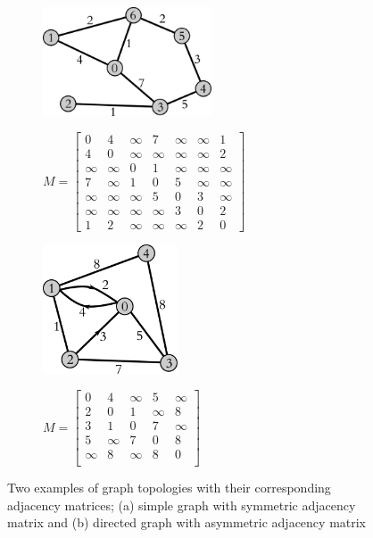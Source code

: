 \documentclass[10pt,letterpaper]{article}
\begin{document}
\begin{figure}[htbp]
\centering
\begin{subfigure}{0.49\textwidth}
\centering
\includegraphics[width=50mm]{dij1.eps}
\end{subfigure}
\begin{subfigure}{0.49\textwidth}
{
\Large
$
M=\begin{bmatrix}
0&4&\infty&7&\infty&\infty&1\\
4&0&\infty&\infty&\infty&\infty&2\\
\infty&\infty&0&1&\infty&\infty&\infty\\
7&\infty&1&0&5&\infty&\infty\\
\infty&\infty&\infty&5&0&3&\infty\\
\infty&\infty&\infty&\infty&3&0&2\\
1&2&\infty&\infty&\infty&2&0
\end{bmatrix}
$
}
\end{subfigure}
\vspace{10mm}
\begin{subfigure}{0.49\textwidth}
\centering
\includegraphics[width=40mm]{dij2.eps}
\end{subfigure}
\begin{subfigure}{0.49\textwidth}
{
\Large
$
M=\begin{bmatrix}
0&4&\infty&5&\infty\\
2&0&1&\infty&8\\
3&1&0&7&\infty\\
5&\infty&7&0&8\\
\infty&8&\infty&8&0\\
\end{bmatrix}
$
}
\end{subfigure}
\caption{Two examples of graph topologies with their corresponding adjacency matrices; (a) simple graph with symmetric adjacency matrix and (b) directed graph with asymmetric adjacency matrix}
\label{fig:ex}
\end{figure}
\end{document}
